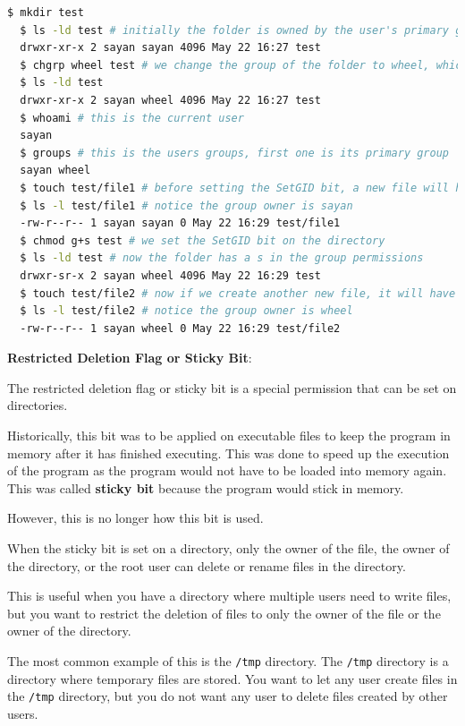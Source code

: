 \begin{lstlisting}[language=bash]
  $ mkdir test
  $ ls -ld test # initially the folder is owned by the user's primary group
  drwxr-xr-x 2 sayan sayan 4096 May 22 16:27 test
  $ chgrp wheel test # we change the group of the folder to wheel, which is a group that the user is part of
  $ ls -ld test
  drwxr-xr-x 2 sayan wheel 4096 May 22 16:27 test
  $ whoami # this is the current user
  sayan
  $ groups # this is the users groups, first one is its primary group
  sayan wheel
  $ touch test/file1 # before setting the SetGID bit, a new file will have group owner as the primary group of the user creating it
  $ ls -l test/file1 # notice the group owner is sayan
  -rw-r--r-- 1 sayan sayan 0 May 22 16:29 test/file1
  $ chmod g+s test # we set the SetGID bit on the directory
  $ ls -ld test # now the folder has a s in the group permissions
  drwxr-sr-x 2 sayan wheel 4096 May 22 16:29 test
  $ touch test/file2 # now if we create another new file, it will have the group owner as the group of the directory
  $ ls -l test/file2 # notice the group owner is wheel
  -rw-r--r-- 1 sayan wheel 0 May 22 16:29 test/file2
\end{lstlisting}

\textbf{Restricted Deletion Flag or Sticky Bit}:

The restricted deletion flag or sticky bit is a special permission that can be set on directories.

Historically, this bit was to be applied on executable files to keep the program in memory after it has finished executing.
This was done to speed up the execution of the program as the program would not have to be loaded into memory again.
This was called \textbf{sticky bit} because the program would stick in memory.

However, this is no longer how this bit is used.

When the sticky bit is set on a directory, only the owner of the file, the owner of the directory, or the root user can delete or rename files in the directory.

This is useful when you have a directory where multiple users need to write files, but you want to restrict the deletion of files to only the owner of the file or the owner of the directory.

The most common example of this is the \texttt{/tmp} directory.
The \texttt{/tmp} directory is a directory where temporary files are stored.
You want to let any user create files in the \texttt{/tmp} directory, but you do not want any user to delete files created by other users.


